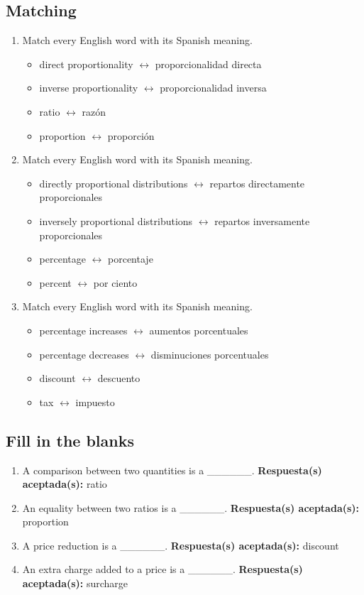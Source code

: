 \documentclass[11pt,a4paper]{article}
\begin{document}
\subsection{Matching}
\begin{enumerate}
\item Match every English word with its Spanish meaning.
\begin{itemize}
\item direct proportionality $\longleftrightarrow$ proporcionalidad directa
\item inverse proportionality $\longleftrightarrow$ proporcionalidad inversa
\item ratio $\longleftrightarrow$ razón
\item proportion $\longleftrightarrow$ proporción
\end{itemize}
\item Match every English word with its Spanish meaning.
\begin{itemize}
\item directly proportional distributions $\longleftrightarrow$ repartos directamente proporcionales
\item inversely proportional distributions $\longleftrightarrow$ repartos inversamente proporcionales
\item percentage $\longleftrightarrow$ porcentaje
\item percent $\longleftrightarrow$ por ciento
\end{itemize}
\item Match every English word with its Spanish meaning.
\begin{itemize}
\item percentage increases $\longleftrightarrow$ aumentos porcentuales
\item percentage decreases $\longleftrightarrow$ disminuciones porcentuales
\item discount $\longleftrightarrow$ descuento
\item tax $\longleftrightarrow$ impuesto
\end{itemize}
\end{enumerate}
\subsection{Fill in the blanks}
\begin{enumerate}
\item A comparison between two quantities is a \_\_\_\_\_\_.
\textbf{Respuesta(s) aceptada(s):} ratio
\item An equality between two ratios is a \_\_\_\_\_\_.
\textbf{Respuesta(s) aceptada(s):} proportion
\item A price reduction is a \_\_\_\_\_\_.
\textbf{Respuesta(s) aceptada(s):} discount
\item An extra charge added to a price is a \_\_\_\_\_\_.
\textbf{Respuesta(s) aceptada(s):} surcharge
\end{enumerate}
\end{document}
